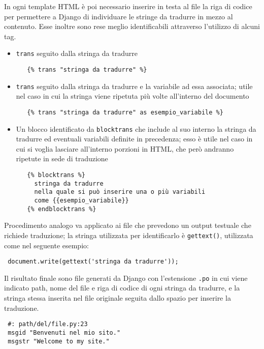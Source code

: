 In ogni template HTML è poi necessario inserire in testa al file la riga di codice  per permettere a Django di individuare le stringe da tradurre in mezzo al contenuto. Esse inoltre sono rese meglio identificabili attraverso l'utilizzo di alcuni tag.

\begin{itemize}
 \item \texttt{trans} seguito dalla stringa da tradurre
  \begin{footnotesize}
  \begin{verbatim}
   {% trans "stringa da tradurre" %}
  \end{verbatim}
  \end{footnotesize}
 \item \texttt{trans} seguito dalla stringa da tradurre e la variabile ad essa associata; utile nel caso in cui la stringa viene ripetuta più volte all'interno del documento
  \begin{footnotesize}
  \begin{verbatim}
   {% trans "stringa da tradurre" as esempio_variabile %}
  \end{verbatim}
  \end{footnotesize}
 \item Un blocco identificato da \texttt{blocktrans} che include al suo interno la stringa da tradurre ed eventuali variabili definite in precedenza; esso è utile nel caso in cui si voglia lasciare all'interno porzioni in HTML, che però andranno ripetute in sede di traduzione
  \begin{footnotesize}
  \begin{verbatim}
   {% blocktrans %} 
     stringa da tradurre 
     nella quale si può inserire una o più variabili
     come {{esempio_variabile}}
   {% endblocktrans %}
  \end{verbatim}
  \end{footnotesize}
\end{itemize}

Procedimento analogo va applicato ai file {\js} che prevedono un output testuale che richiede traduzione; la stringa utilizzata per identificarlo è \texttt{gettext()}, utilizzata come nel seguente esempio:
\begin{footnotesize}
\begin{verbatim}
 document.write(gettext('stringa da tradurre'));
\end{verbatim}
\end{footnotesize}

Il risultato finale sono file generati da Django con l'estensione \texttt{.po} in cui viene indicato path, nome del file e riga di codice di ogni stringa da tradurre, e la stringa stessa inserita nel file originale seguita dallo spazio per inserire la traduzione.
\begin{footnotesize}
\begin{verbatim}
 #: path/del/file.py:23
 msgid "Benvenuti nel mio sito."
 msgstr "Welcome to my site."
\end{verbatim}
\end{footnotesize}

